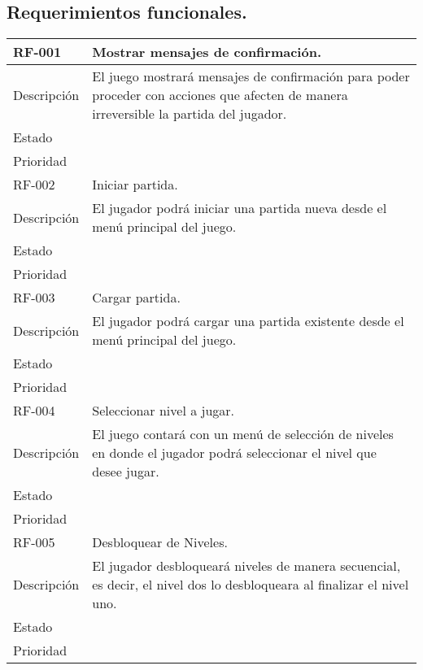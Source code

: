 \subsection{Requerimientos funcionales.}
	\begin{longtable}[c]{ | m{5cm} | m{10cm}|} 
		\hline
		\rowcolor{cyan}RF-001\label{RF:01} & Mostrar mensajes de confirmación. \\ 
		\hline
		Descripción	& El juego mostrará mensajes de confirmación para poder proceder con acciones que afecten de manera irreversible la partida del jugador. \\ 
		\hline
		Estado &  \\ 
		\hline
		Prioridad &  \\
		\hline
		\rowcolor{cyan}RF-002\label{RF:02} & Iniciar partida. \\ 
		\hline
		Descripción	& El jugador podrá iniciar una partida nueva desde el menú principal del juego. \\ 
		\hline
		Estado &  \\ 
		\hline
		Prioridad &  \\
		\hline
		\rowcolor{cyan}RF-003\label{RF:03} & Cargar partida.\\ 
		\hline
		Descripción	& El jugador podrá cargar una partida existente desde el menú principal del juego. \\ 
		\hline
		Estado &  \\ 
		\hline
		Prioridad &  \\
		\hline
		\rowcolor{cyan}RF-004\label{RF:04} & Seleccionar nivel a jugar. \\ 
		\hline
		Descripción	& El juego contará con un menú de selección de niveles en donde el jugador podrá seleccionar el nivel que desee jugar. \\ 
		\hline
		Estado &  \\ 
		\hline
		Prioridad &  \\
		\hline
		\rowcolor{cyan}RF-005\label{RF:05} & Desbloquear de Niveles. \\ 
		\hline
		Descripción	& El jugador desbloqueará niveles de manera secuencial, es decir, el nivel dos lo desbloqueara al finalizar el nivel uno. \\ 
		\hline
		Estado &  \\ 
		\hline
		Prioridad &  \\

\end{longtable}
